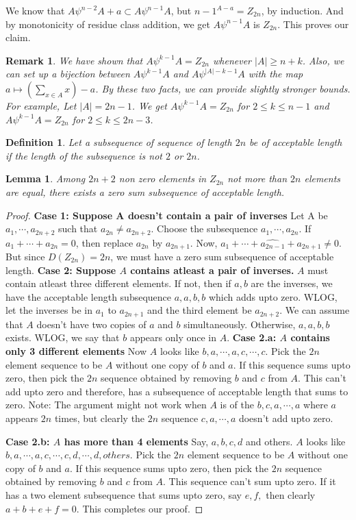 \documentclass[reqno,10pt]{amsart}
\newtheorem{definition}[prop]{Definition}
\newtheorem{lem}[prop]{ Lemma}
\newtheorem{remar}[prop]{Remark}
\begin{document}
We know that $A \psi^{n-2} A+{a} \subset A \psi^{n-1} A $, but ${n-1}^{A-{a}}=Z_{2n}$, by induction. And by monotonicity of residue class addition, we get $A \psi^{n-1} A$ is $Z_{2n}$. This proves our claim.
\begin{remar}
We have shown that $A \psi^{k-1} A=Z_{2n}$ whenever $|A| \geq n+k$. Also, we can set up a bijection between $A \psi^{k-1} A$ and $A \psi^{|A|-k-1} A$ with the map $a \mapsto \left(\sum _{x\in A}  x\right)-a $. 
By these two facts, we can provide slightly stronger bounds. For example, 
Let $|A|=2n-1$. We get $A \psi^{k-1} A=Z_{2n}$ for $2\leq k \leq n-1$ and  $A \psi^{k-1} A=Z_{2n}$ for $2\leq k \leq 2n-3$. 
\end{remar}
\begin{definition}
 Let a subsequence of sequence of length $2n$ be of acceptable length if the length of the subsequence is not $2$ or $2n$.
\end{definition} 
\begin{lem}\label{non zero lemma}Among $2n+2$ non zero elements in $Z_{2n}$ not more than $2n$ elements are equal, there exists a zero sum subsequence of acceptable length.
\end{lem}
\begin{proof}
\textbf{Case 1: Suppose A doesn't contain a pair of inverses}
Let A be $a_1, \cdots ,a_{2n+2}$ such that $a_{2n} \neq a_{2n+2}$. Choose the subsequence $a_1,\cdots, a_{2n}$.
If $a_1+\cdots+ a_{2n}=0 $, then replace $a_{2n}$ by $a_{2n+1}$.
Now, $a_1+\cdots+ \hat{a_{2n-1}}+a_{2n+1}\neq 0 $.
But since $D(Z_{2n})=2n$, we must have a zero sum subsequence of acceptable length.
\textbf{Case 2:
Suppose $A$ contains atleast a pair of inverses.} $A$ must contain atleast three different elements.
If not, then if $a, b$ are the inverses, we have the acceptable length subsequence $a,a,b,b$ which adds upto zero.
WLOG, let the inverses be in $a_1$ to $a_{2n+1}$ and the third element be $a_{2n+2}$. We can assume that $A$ doesn't have two copies of $a$ and $b$ simultaneously. Otherwise, $a,a,b,b$ exists.
WLOG, we say that $b$ appears only once in $A.$
\textbf{Case 2.a: $A$ contains only 3 different elements}
Now $A$ looks like $b,a,\cdots,a,c,\cdots,c$.
Pick the $2n$ element sequence to be $A$ without one copy of $b$ and $a.$ If this sequence sums upto zero, then pick the $2n$ sequence obtained by removing $b$ and $c$ from $A.$ This can't add upto zero and therefore, has a subsequence of acceptable length that sums to zero.
Note: The argument might not work when $A$ is of the $b,c,a,\cdots,a$ where $a$ appears $2n$ times, but clearly the $2n$ sequence $c,a,\cdots,a$ doesn't add upto zero.

\textbf{Case 2.b: $A$ has more than 4 elements}
Say, $a,b,c,d$ and others.
$A$ looks like \\
$b,a,\cdots,a,c,\cdots ,c, d,\cdots,d,others$.
Pick the $2n$ element sequence to be $A$ without one copy of $b$ and $a.$ If this sequence sums upto zero, then pick the $2n$ sequence obtained by removing $b$ and $c$ from $A.$ This sequence can't sum upto zero. If it has a two element subsequence that sums upto zero, say $e,f,$ then clearly $a+b+e+f=0.$ This completes our proof.
\end{proof}
\end{document}
